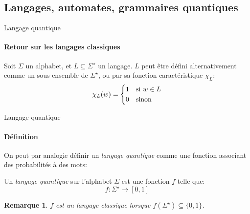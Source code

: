 \documentclass[aspectratio=169]{beamer}
\theoremstyle{plain}
\newtheorem*{remark}{Remarque}
\theoremstyle{definition}
\begin{document}
%

\subsection{Langages, automates, grammaires quantiques}
\begin{frame}{Langage quantique}
    \framesubtitle{Retour sur les langages classiques}
    Soit $\Sigma$ un alphabet, et $L\subseteq \Sigma^\star$ un langage. $L$ peut être défini alternativement comme un sous-ensemble de $\Sigma^\star$, ou par sa fonction caractéristique $\chi_L$:
    \begin{equation*}
        \chi_L(w) = \begin{cases*}
            1 & si $w\in L$\\
            0 & sinon
        \end{cases*}
    \end{equation*}
\end{frame}

\begin{frame}{Langage quantique}
    \framesubtitle{Définition}
    On peut par analogie définir un \emph{langage quantique} comme une fonction associant des probabilités à des mots:
    \begin{definition}
        Un \emph{langage quantique} sur l'alphabet $\Sigma$ est une fonction $f$ telle que:
        \begin{equation*}
            f : \Sigma^\star \to [0, 1]
        \end{equation*}
        
    \end{definition}

    \begin{remark}
        $f$ est un langage classique lorsque $f(\Sigma^\star) \subseteq \{0, 1\}$.
    \end{remark}
\end{frame}
\end{document}
